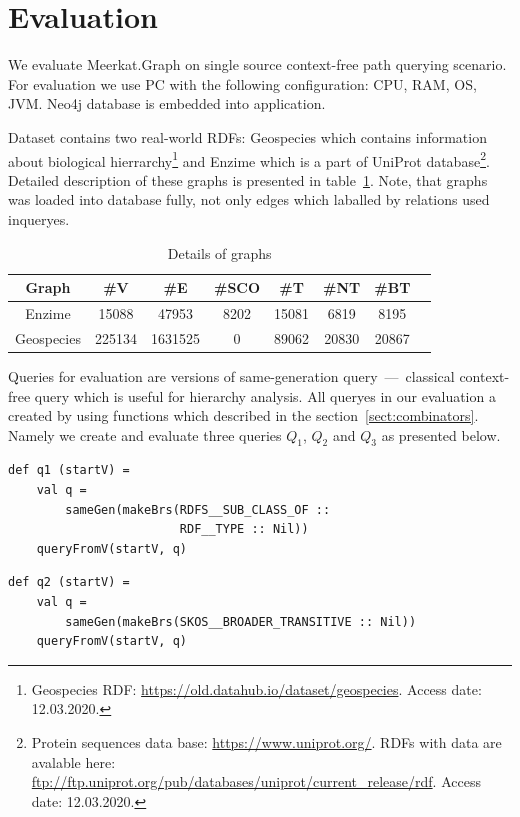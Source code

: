 \section{Evaluation}

We evaluate Meerkat.Graph on single source context-free path querying scenario.
For evaluation we use PC with the following configuration: CPU, RAM, OS, JVM.
Neo4j database is embedded into application.

Dataset contains two real-world RDFs: Geospecies which contains information about biological hierrarchy\footnote{Geospecies RDF: \url{https://old.datahub.io/dataset/geospecies}. Access date: 12.03.2020.} and Enzime which is a part of UniProt database\footnote{Protein sequences data base: \url{https://www.uniprot.org/}. RDFs with data are avalable here: \url{ftp://ftp.uniprot.org/pub/databases/uniprot/current_release/rdf}. Access date: 12.03.2020.}.
Detailed description of these graphs is presented in table~\ref{tbl:datasetDetails}.
Note, that graphs was loaded into database fully, not only edges which laballed by relations used inqueryes.

{
\setlength{\tabcolsep}{4pt}
\begin{table}[ht]
\begin{tabular}{|c|c|c|c|c|c|c|c|}
\hline
 Graph      & \#V & \#E & \#SCO & \#T & \#NT & \#BT \\
 \hline
 Enzime     & 15088  & 47953   & 8202 & 15081 & 6819  & 8195 \\
 Geospecies & 225134 & 1631525 & 0    & 89062 & 20830 & 20867 \\
 \hline
\end{tabular}
\caption{Details of graphs}
\label{tbl:datasetDetails}
\end{table}
}

Queries for evaluation are versions of same-generation query~---~classical context-free query which is useful for hierarchy analysis.
All queryes in our evaluation a created by using functions which described in the section~\ref{sect:combinators}. Namely we create and evaluate three queries $Q_1$, $Q_2$ and $Q_3$ as presented below.

\begin{lstlisting}
def q1 (startV) =
    val q =
        sameGen(makeBrs(RDFS__SUB_CLASS_OF ::
                        RDF__TYPE :: Nil))
    queryFromV(startV, q)
\end{lstlisting}

\begin{lstlisting}
def q2 (startV) =
    val q =
        sameGen(makeBrs(SKOS__BROADER_TRANSITIVE :: Nil))
    queryFromV(startV, q)
\end{lstlisting}

